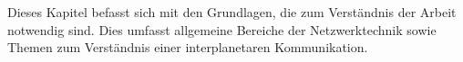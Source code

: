 \label{cap:grundlagen}
Dieses Kapitel befasst sich mit den Grundlagen, die zum Verst{\"a}ndnis der
Arbeit notwendig sind. Dies umfasst allgemeine Bereiche der
Netzwerktechnik sowie Themen zum Verständnis einer interplanetaren
Kommunikation.
